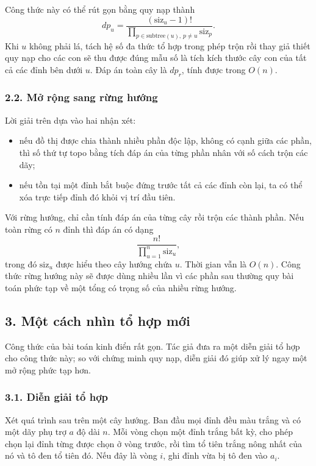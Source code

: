 \documentclass[11pt]{article}
\begin{document}
Công thức này có thể rút gọn bằng quy nạp thành
\[
  dp_u =
  \frac{(\mathrm{siz}_u-1)!}
       {\prod_{p\in \mathrm{subtree}(u),\,p\ne u}\mathrm{siz}_p}.
\]
Khi \(u\) không phải lá, tách hệ số đa thức tổ hợp trong phép trộn rồi thay giả
thiết quy nạp cho các con sẽ thu được đúng mẫu số là tích kích thước cây con của
tất cả các đỉnh bên dưới \(u\). Đáp án toàn cây là \(dp_r\), tính được trong
\(O(n)\).

\subsubsection*{2.2. Mở rộng sang rừng hướng}

Lời giải trên dựa vào hai nhận xét:
\begin{itemize}
  \item nếu đồ thị được chia thành nhiều phần độc lập, không có cạnh giữa các
  phần, thì số thứ tự topo bằng tích đáp án của từng phần nhân với số cách trộn
  các dãy;
  \item nếu tồn tại một đỉnh bắt buộc đứng trước tất cả các đỉnh còn lại, ta có
  thể xóa trực tiếp đỉnh đó khỏi vị trí đầu tiên.
\end{itemize}

Với rừng hướng, chỉ cần tính đáp án của từng cây rồi trộn các thành phần. Nếu
toàn rừng có \(n\) đỉnh thì đáp án có dạng
\[
  \frac{n!}{\prod_{u=1}^n \mathrm{siz}_u},
\]
trong đó \(\mathrm{siz}_u\) được hiểu theo cây hướng chứa \(u\). Thời gian vẫn
là \(O(n)\). Công thức rừng hướng này sẽ được dùng nhiều lần vì các phần sau
thường quy bài toán phức tạp về một tổng có trọng số của nhiều rừng hướng.

\subsection*{3. Một cách nhìn tổ hợp mới}

Công thức của bài toán kinh điển rất gọn. Tác giả đưa ra một diễn giải tổ hợp
cho công thức này; so với chứng minh quy nạp, diễn giải đó giúp xử lý ngay một
mở rộng phức tạp hơn.

\subsubsection*{3.1. Diễn giải tổ hợp}

Xét quá trình sau trên một cây hướng. Ban đầu mọi đỉnh đều màu trắng và có một
dãy phụ trợ \(a\) độ dài \(n\). Mỗi vòng chọn một đỉnh trắng bất kỳ, cho phép
chọn lại đỉnh từng được chọn ở vòng trước, rồi tìm tổ tiên trắng nông nhất của
nó và tô đen tổ tiên đó. Nếu đây là vòng \(i\), ghi đỉnh vừa bị tô đen vào
\(a_i\).
\end{document}
